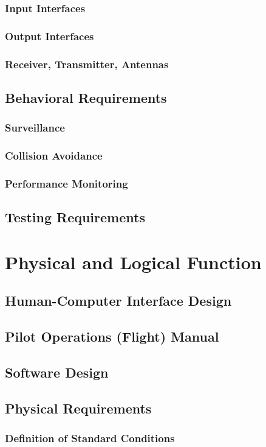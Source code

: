 \documentclass[12pt]{report}
\begin{document}
\subsection{Input Interfaces}
\subsection{Output Interfaces}
\subsection{Receiver, Transmitter, Antennas}
\section{Behavioral Requirements}
\subsection{Surveillance}
\subsection{Collision Avoidance}
\subsection{Performance Monitoring}
\section{Testing Requirements}

\chapter{Physical and Logical Function}
\section{Human-Computer Interface Design}
\section{Pilot Operations (Flight) Manual}
\section{Software Design}
\section{Physical Requirements}
\subsection{Definition of Standard Conditions}
\end{document}
